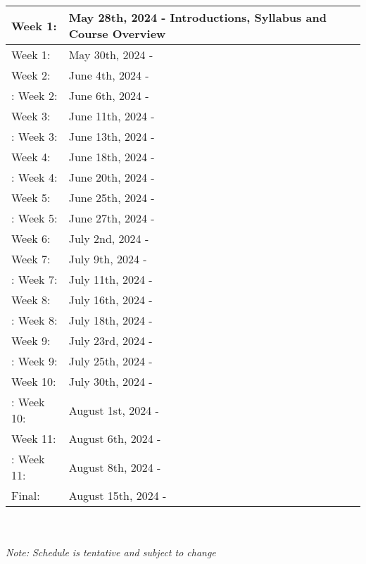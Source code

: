 \renewcommand{\arraystretch}{1.5}



\begin{tabular}{ | l | l |  }
    \hline
    Week 1: & May 28th, 2024 - Introductions, Syllabus and Course Overview \\
    \hline
    Week 1: & May 30th, 2024 - \\
    \hline
    Week 2: & June 4th, 2024 - \\ 
    \hline:
    Week 2: & June 6th, 2024 - \\ 
    \hline
    Week 3: & June 11th, 2024 - \\ 
    \hline:
    Week 3: & June 13th, 2024 - \\ 
    \hline
    Week 4: & June 18th, 2024 - \\ 
    \hline:
    Week 4: & June 20th, 2024 - \\ 
    \hline
    Week 5: & June 25th, 2024 - \\ 
    \hline:
    Week 5: & June 27th, 2024 - \\ 
    \hline
    Week 6: & July 2nd, 2024 - \\ 
    \hline
    Week 7: & July 9th, 2024 - \\ 
    \hline:
    Week 7: & July 11th, 2024 - \\ 
    \hline
    Week 8: & July 16th, 2024 - \\ 
    \hline:
    Week 8: & July 18th, 2024 - \\ 
    \hline
    Week 9: & July 23rd, 2024 - \\ 
    \hline:
    Week 9: & July 25th, 2024 - \\ 
    \hline
    Week 10: & July 30th, 2024 - \\ 
    \hline:
    Week 10: & August 1st, 2024 - \\ 
    \hline
    Week 11: & August 6th, 2024 - \\ 
    \hline:
    Week 11: & August 8th, 2024 - \\ 
    \hline
    Final: & August 15th, 2024 - \\ 
\end{tabular}
\\ \\
\textit{Note: Schedule is tentative and subject to change}

    